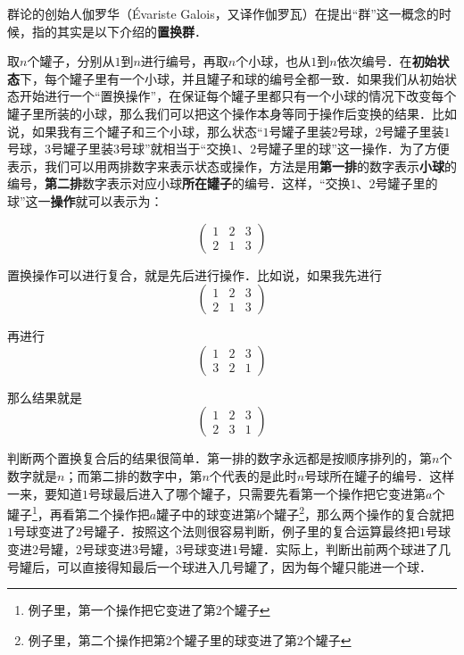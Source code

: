 
群论的创始人伽罗华（Évariste Galois，又译作伽罗瓦）在提出“群”这一概念的时候，指的其实是以下介绍的\textbf{置换群}．

取$n$个罐子，分别从$1$到$n$进行编号，再取$n$个小球，也从$1$到$n$依次编号．在\textbf{初始状态}下，每个罐子里有一个小球，并且罐子和球的编号全都一致．如果我们从初始状态开始进行一个“置换操作”，在保证每个罐子里都只有一个小球的情况下改变每个罐子里所装的小球，那么我们可以把这个操作本身等同于操作后变换的结果．比如说，如果我有三个罐子和三个小球，那么状态“$1$号罐子里装$2$号球，$2$号罐子里装$1$号球，$3$号罐子里装$3$号球”就相当于“交换$1$、$2$号罐子里的球”这一操作．为了方便表示，我们可以用两排数字来表示状态或操作，方法是用\textbf{第一排}的数字表示\textbf{小球}的编号，\textbf{第二排}数字表示对应小球\textbf{所在罐子}的编号．这样，“交换$1$、$2$号罐子里的球”这一\textbf{操作}就可以表示为：

\begin{equation}\begin{pmatrix}
1&2&3\\2&1&3
\end{pmatrix}\end{equation}


置换操作可以进行复合，就是先后进行操作．比如说，如果我先进行\begin{equation}\begin{pmatrix}
1&2&3\\2&1&3
\end{pmatrix}\end{equation}

再进行\begin{equation}\begin{pmatrix}
1&2&3\\3&2&1
\end{pmatrix}\end{equation}

那么结果就是\begin{equation}\begin{pmatrix}
1&2&3\\2&3&1
\end{pmatrix}\end{equation}

判断两个置换复合后的结果很简单．第一排的数字永远都是按顺序排列的，第$n$个数字就是$n$；而第二排的数字中，第$n$个代表的是此时$n$号球所在罐子的编号．这样一来，要知道$1$号球最后进入了哪个罐子，只需要先看第一个操作把它变进第$a$个罐子\footnote{例子里，第一个操作把它变进了第$2$个罐子}，再看第二个操作把$a$罐子中的球变进第$b$个罐子\footnote{例子里，第二个操作把第$2$个罐子里的球变进了第$2$个罐子}，那么两个操作的复合就把$1$号球变进了$2$号罐子．按照这个法则很容易判断，例子里的复合运算最终把$1$号球变进$2$号罐，$2$号球变进$3$号罐，$3$号球变进$1$号罐．实际上，判断出前两个球进了几号罐后，可以直接得知最后一个球进入几号罐了，因为每个罐只能进一个球．

